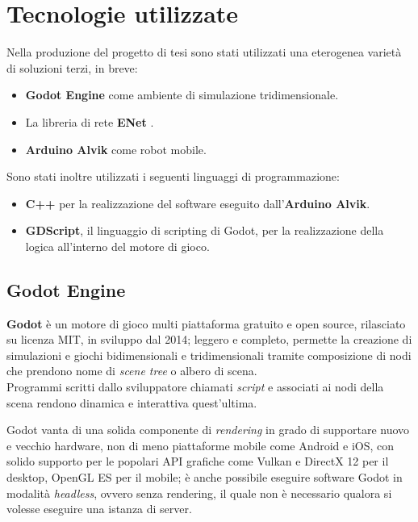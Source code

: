\chapter{Tecnologie utilizzate}
Nella produzione del progetto di tesi sono stati utilizzati
una eterogenea varietà di soluzioni terzi, in breve:
\begin{itemize}
	\item \textbf{Godot Engine} come ambiente di simulazione tridimensionale. 
	\item La libreria di rete \textbf{ENet} .
	\item \textbf{Arduino Alvik} come robot mobile. 
\end{itemize}

Sono stati inoltre utilizzati i seguenti linguaggi di programmazione:
\begin{itemize}
	\item \textbf{C++} per la realizzazione del software eseguito dall'\textbf{Arduino Alvik}.
	\item \textbf{GDScript}, il linguaggio di scripting di Godot, per la realizzazione della logica all'interno del motore di gioco.
\end{itemize}

\pagebreak
\section{Godot Engine}
\textbf{Godot} \cite{GodotEngine} è un motore di gioco multi piattaforma gratuito e open source,
rilasciato su licenza MIT, in sviluppo dal 2014; leggero e completo, permette la creazione di simulazioni e giochi bidimensionali e tridimensionali tramite composizione di nodi che prendono nome di \textit{scene tree} o albero di scena. \\
Programmi scritti dallo sviluppatore chiamati \textit{script} e associati ai nodi della scena rendono dinamica e interattiva quest'ultima.
\medbreak

Godot vanta di una solida componente di \textit{rendering} in grado di supportare nuovo e vecchio hardware, non di meno piattaforme mobile come Android e iOS, con solido supporto  per le popolari API grafiche come Vulkan e DirectX 12 per il desktop, OpenGL ES per il mobile; è anche possibile eseguire software Godot in modalità \textit{headless}, ovvero senza rendering, il quale non è necessario qualora si volesse eseguire una istanza di server.

